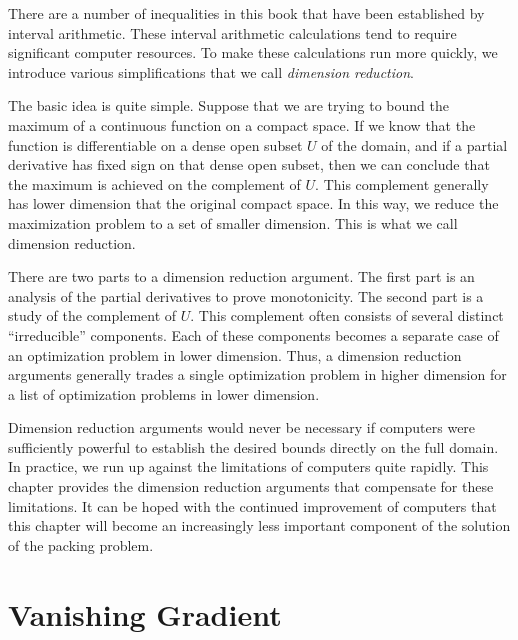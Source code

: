 
\label{chap:reduction}

There are a number of inequalities in this book that have been
established by interval arithmetic.  These interval arithmetic
calculations tend to require significant computer resources.  To
make these calculations run more quickly, we introduce various
simplifications that we call {\it dimension reduction}.

The basic idea is quite simple.  Suppose that we are trying to
bound the maximum of a continuous function on a compact space.  If
we know that the function is differentiable on a dense open subset
$U$ of the domain, and if a partial derivative has fixed sign on
that dense open subset, then we can conclude that the maximum is
achieved on the complement of $U$.   This complement generally has
lower dimension that the original compact space.  In this way, we
reduce the maximization problem to a set of smaller dimension.
This is what we call dimension reduction.

There are two parts to a dimension reduction argument.  The first
part is an analysis of the partial derivatives to prove
monotonicity.  The second part is a study of the complement of
$U$.  This complement often consists of several distinct
``irreducible'' components.  Each of these components becomes a
separate case of an optimization problem in lower dimension. Thus,
a dimension reduction arguments generally trades a single
optimization problem in higher dimension for a list of
optimization problems in lower dimension.

Dimension reduction arguments would never be necessary if
computers were sufficiently powerful to establish the desired
bounds directly on the full domain.  In practice, we run up
against the limitations of computers quite rapidly.  This chapter
provides the dimension reduction arguments that compensate for
these limitations.  It can be hoped with the continued improvement
of computers that this chapter will become an increasingly less
important component of the solution of the packing problem.


\section{Vanishing Gradient}\label{sec:gradient}


